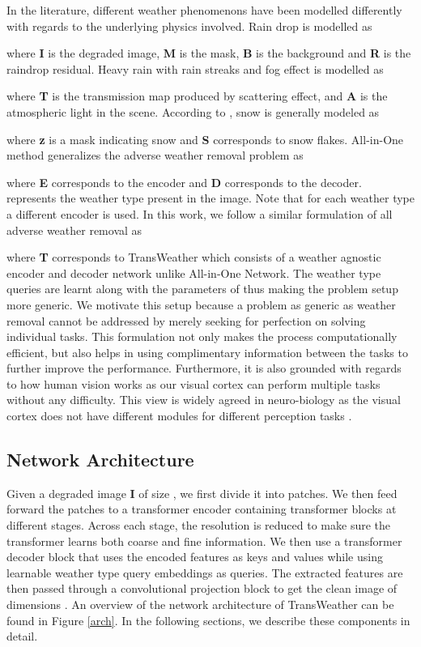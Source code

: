 \documentclass[10pt,twocolumn,letterpaper]{article}
\begin{document}
In the literature, different weather phenomenons have been modelled differently with regards to the underlying physics involved. Rain drop \cite{qian2018attentive} is modelled as 

where \textbf{I} is the degraded image, \textbf{M} is the mask, \textbf{B} is the background and \textbf{R} is the raindrop residual. Heavy rain with rain streaks and fog effect \cite{li2019heavy} is modelled as 

where \textbf{T} is the transmission map produced by scattering effect,  and \textbf{A} is the atmospheric light in the scene. According to \cite{liu2018desnownet}, snow is generally modeled as 

where \textbf{z} is a mask indicating snow and \textbf{S} corresponds to snow flakes. All-in-One method \cite{li2020all} generalizes the adverse weather removal problem as

where \textbf{E} corresponds to the encoder and \textbf{D} corresponds to the decoder.  represents the weather type present in the image. Note that for each weather type a different encoder is used. In this work, we follow a similar formulation of all adverse weather removal as

where \textbf{T} corresponds to TransWeather which consists of a weather agnostic encoder and decoder network unlike All-in-One Network. The weather type queries are learnt along with the parameters of  thus making the problem setup more generic. We motivate this setup because a problem as generic as weather removal cannot be addressed
by merely seeking for perfection on solving individual
tasks. This formulation not only makes the process computationally efficient, but also helps in using complimentary information between the tasks to further improve the performance. Furthermore, it is also grounded with regards to how human vision works as our visual cortex can perform multiple tasks without any difficulty.  This view is widely agreed in neuro-biology as the visual cortex does not have different modules for different perception tasks \cite{mcmanus2011adaptive, li2004perceptual}.



\subsection{Network Architecture}
Given a degraded image \textbf{I} of size , we first divide it into patches. We then feed forward the patches to a transformer encoder containing transformer blocks at different stages. Across each stage, the resolution is reduced to make sure the transformer learns both coarse and fine information. We then use a transformer decoder block that uses the encoded features as keys and values while using learnable weather type query embeddings as queries. The extracted features are then passed through a convolutional projection block to get the clean image of dimensions . An overview of the network architecture of TransWeather can be found in Figure \ref{arch}. In the following sections, we describe these components in detail.
\end{document}
